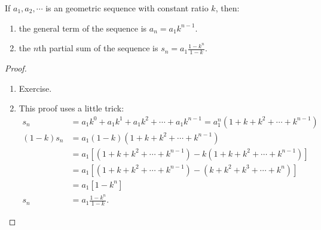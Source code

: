 \begin{thm}
  If $ a_1, a_2, \cdots $ is an geometric sequence with constant ratio $ k $, then:
  \begin{enumerate}
    \item the general term of the sequence is $ a_n = a_1 k^{n - 1} $.
    \item the $ n$th partial sum of the sequence is $ s_n = a_1 \frac{1 - k^n}{1 - k}$.
  \end{enumerate}
\end{thm}
\begin{proof}\leavevmode
  \begin{enumerate}
    \item Exercise.
    \item This proof uses a little trick:
      \begin{align*}
               s_n &= a_1 k^0 + a_1 k^1 + a_1 k^2 + \cdots + a_1 k^{n - 1} = a_1^n (1 + k + k^2 + \cdots + k^{n - 1})\\
        (1 - k)s_n &= a_1 (1-k)(1 + k + k^2 + \cdots + k^{n - 1})\\
                   &= a_1 [(1 + k + k^2 + \cdots + k^{n - 1}) - k(1 + k + k^2 + \cdots + k^{n - 1})]\\
                   &= a_1 [(1 + k + k^2 + \cdots + k^{n - 1}) - (k + k^2 + k^3 + \cdots + k^n)]\\
                   &= a_1 [1 - k^n]\\
               s_n &= a_1 \frac{1 - k^n}{1 - k}.
      \end{align*}
  \end{enumerate}
\end{proof}


